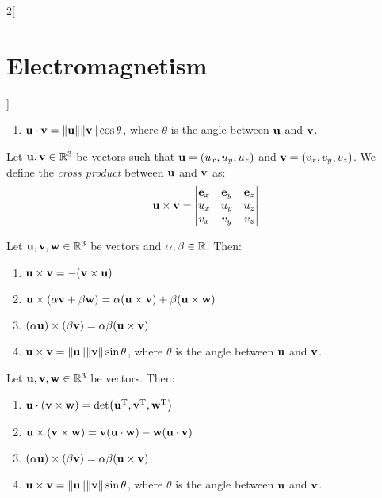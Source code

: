 \documentclass[../../../main.tex]{subfiles}
\begin{document}
\begin{multicols}{2}[\section{Electromagnetism}]
\begin{prop}
\begin{enumerate}
      \item $\vf{u}\cdot\vf{v}=\norm{\vf{u}}\norm{\vf{v}}\cos\theta$, where $\theta$ is the angle between $\vf{u}$ and $\vf{v}$.
    \end{enumerate}
  \end{prop}
  \begin{definition}
    Let $\vf{u},\vf{v}\in\RR^3$ be vectors such that $\vf{u}=(u_x,u_y,u_z)$ and $\vf{v}=(v_x,v_y,v_z)$. We define the \emph{cross product} between $\vf{u}$ and $\vf{v}$ as: $$\vf{u}\times\vf{v}=
      \begin{vmatrix}
        \vf{e}_x & \vf{e}_y & \vf{e}_z \\
        u_x      & u_y      & u_z      \\
        v_x      & v_y      & v_z      \\
      \end{vmatrix}$$
  \end{definition}
  \begin{prop}
    Let $\vf{u},\vf{v},\vf{w}\in\RR^3$ be vectors and $\alpha,\beta \in\RR$. Then:
    \begin{enumerate}
      \item $\vf{u}\times\vf{v}=-(\vf{v}\times\vf{u})$
      \item $\vf{u}\times(\alpha\vf{v}+\beta\vf{w})=\alpha(\vf{u}\times\vf{v})+\beta(\vf{u}\times\vf{w})$
      \item $(\alpha\vf{u})\times(\beta\vf{v})=\alpha\beta(\vf{u}\times\vf{v})$
      \item $\vf{u}\times\vf{v}=\norm{\vf{u}}\norm{\vf{v}}\sin\theta$, where $\theta$ is the angle between $\vf{u}$ and $\vf{v}$.
    \end{enumerate}
  \end{prop}
  \begin{prop}
    Let $\vf{u},\vf{v},\vf{w}\in\RR^3$ be vectors. Then:
    \begin{enumerate}
      \item $\vf{u}\cdot(\vf{v}\times\vf{w})=\det(\transpose{u},\transpose{v},\transpose{w})$
      \item $\vf{u}\times(\vf{v}\times\vf{w})=\vf{v}(\vf{u}\cdot\vf{w})-\vf{w}(\vf{u}\cdot\vf{v})$
      \item $(\alpha\vf{u})\times(\beta\vf{v})=\alpha\beta(\vf{u}\times\vf{v})$
      \item $\vf{u}\times\vf{v}=\norm{\vf{u}}\norm{\vf{v}}\sin\theta$, where $\theta$ is the angle between $\vf{u}$ and $\vf{v}$.
    \end{enumerate}

\end{prop}
\end{multicols}
\end{document}
